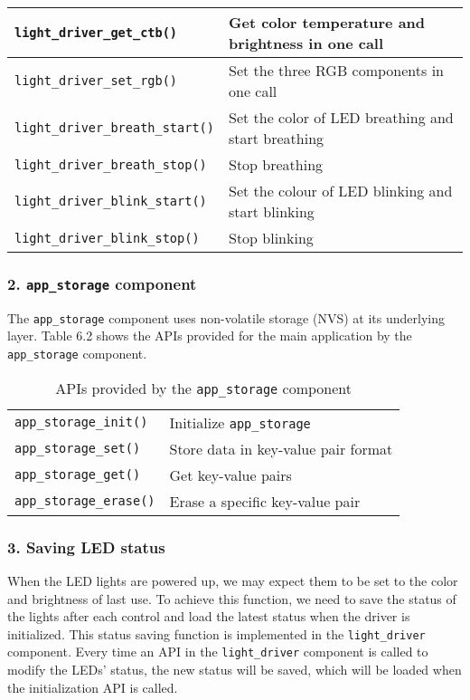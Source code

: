 \documentclass[a4paper,12pt]{book}
\begin{document}
{\begin{longtable}{|>{\footnotesize}m{}|>{\footnotesize}m{}|}
    \hline
    \verb|light_driver_get_ctb()|&Get color temperature and brightness in one call\\
    \hline
    \verb|light_driver_set_rgb()|&Set the three RGB components in one call\\
    \hline
    \verb|light_driver_breath_start()|&Set the color of LED breathing and start breathing\\
    \hline
    \verb|light_driver_breath_stop()|&Stop breathing\\
    \hline
    \verb|light_driver_blink_start()|&Set the colour of LED blinking and start blinking\\
    \hline
    \verb|light_driver_blink_stop()|&Stop blinking\\
    \hline
\end{longtable}
}

\subsubsection{2. \texttt{app\_storage} component}

The \verb|app_storage| component uses non-volatile storage (NVS) at its underlying layer. Table 6.2 shows the APIs provided for the main application by the \verb|app_storage| component.

\begin{table}[h!]
    \renewcommand{\arraystretch}{1.2}
    \caption{APIs provided by the \texttt{app\_storage} component}
    \begin{tabular}{|>{\footnotesize}m{}|>{\footnotesize}m{}|}
        \hline
        \rowcolor{LightBlue}\multicolumn{1}{|c|}{\textbf{API}}&\multicolumn{1}{c|}{\textbf{Function}}\\
        \hline
        \verb|app_storage_init()|&Initialize \verb|app_storage|\\
        \hline
        \verb|app_storage_set()|&Store data in key-value pair format\\
        \hline
        \verb|app_storage_get()|&Get key-value pairs\\
        \hline
        \verb|app_storage_erase()|&Erase a specific key-value pair\\
        \hline
    \end{tabular}
\end{table}

\subsubsection{3. Saving LED status}
When the LED lights are powered up, we may expect them to be set to the color and brightness of last use. To achieve this function, we need to save the status of the lights after each control and load the latest status when the driver is initialized. This status saving function is implemented in the \verb|light_driver| component. Every time an API in the \verb|light_driver| component is called to modify the LEDs’ status, the new status will be saved, which will be loaded when the initialization API is called.
\end{document}
